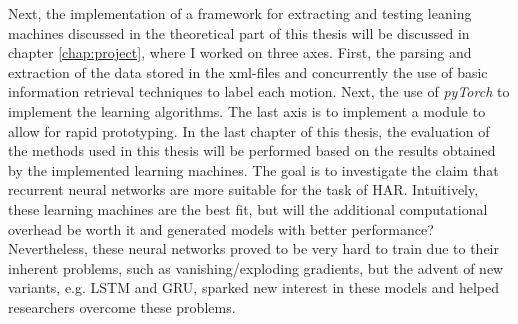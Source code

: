 	Next, the implementation of a framework for extracting and testing leaning machines discussed in the theoretical part of this thesis will be discussed in chapter \ref{chap:project}, where I worked on three axes. First, the parsing and extraction of the data stored in the xml-files and concurrently the use of basic information retrieval techniques to label each motion. Next, the use of \textit{pyTorch} to implement the learning algorithms. The last axis is to implement a module to allow for rapid prototyping.\newline
	In the last chapter of this thesis, the evaluation of the methods used in this thesis will be performed based on the results obtained by the implemented learning machines. The goal is to investigate the claim that recurrent neural networks are more suitable for the task of HAR. Intuitively, these learning machines are the best fit, but will the additional computational overhead be worth it and generated models with better performance? Nevertheless, these neural networks proved to be very hard to train due to their inherent problems, such as vanishing/exploding gradients, but the advent of new variants, e.g. LSTM and GRU, sparked new interest in these models and helped researchers overcome these problems.
